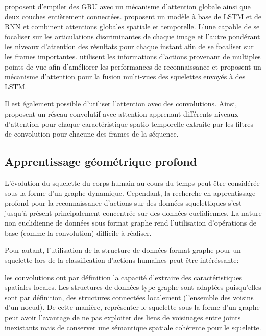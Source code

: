 
\cite{maghoumi2019deepgru} proposent d'empiler des GRU avec un mécanisme d'attention globale ainsi que deux couches entièrement connectées. \cite{song2017end} proposent un modèle à base de LSTM et de RNN et combinent attentions globales spatiale et temporelle. L'une capable de se focaliser sur les articulations discriminantes de chaque image et  l'autre pondérant les niveaux d'attention des résultats pour chaque instant afin de se focaliser sur les frames importantes. \cite{Fan2019AttentionBasedMR} utilisent les informations d'actions provenant de multiples points de vue afin d'améliorer les performances de reconnaissance et proposent un mécanisme d'attention pour la fusion multi-vues des squelettes envoyés à des LSTM. 

Il est également possible d'utiliser l'attention avec des convolutions.
Ainsi, \cite{hou2018spatial} proposent un réseau convolutif avec attention apprenant différents niveaux d'attention pour chaque caractéristique spatio-temporelle extraite par les filtres de convolution pour chacune des  frames de la séquence.

\subsection{Apprentissage géométrique profond}
L'évolution du squelette du corps humain au cours du temps peut être considérée sous la forme d'un graphe dynamique. Cependant, la recherche en apprentissage profond pour la reconnaissance d'actions sur des données squelettiques s'est jusqu'à présent principalement concentrée sur des données euclidiennes.
La nature non euclidienne de données sous format graphe rend l'utilisation d'opérations de base (comme la convolution) difficile à réaliser. 

Pour autant, l'utilisation de la structure de données format graphe pour un squelette lors de la classification d'actions humaines peut être intéréssante:

les convolutions ont par définition la capacité d'extraire des caractéristiques spatiales locales. Les structures de données type graphe sont adaptées puisqu'elles sont par définition, des structures connectées localement (l’ensemble des voisins d’un noeud). De cette manière, représenter le squelette sous la forme d'un graphe peut avoir l'avantage de ne pas exploiter des liens de voisinages entre joints inexistants mais de conserver une sémantique spatiale cohérente pour le squelette.

